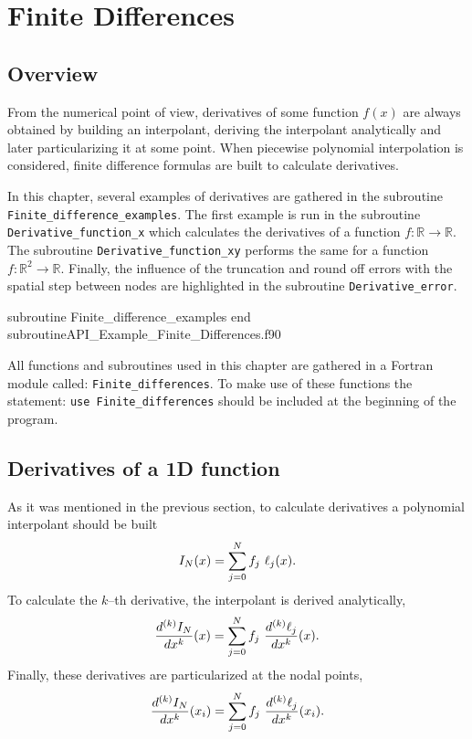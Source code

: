  
    
    \chapter{Finite Differences  }
    \label{Finite_Differences}

    
    
    
    \section{Overview} 
    
   From the numerical point of view, derivatives of some function $ f(x) $ are always obtained by building an interpolant, deriving the interpolant analytically and later particularizing it at some point.  When piecewise polynomial interpolation is considered, finite difference formulas are built to calculate derivatives. 
       
  In this chapter, several examples of derivatives are gathered in the subroutine \verb|Finite_difference_examples|. 
   The first example is run in the subroutine \verb|Derivative_function_x| which calculates the derivatives  of a function $f:\mathbb{R} \rightarrow \mathbb{R}$.
  The subroutine \verb|Derivative_function_xy| performs the same for a function   $f:\mathbb{R}^2\rightarrow \mathbb{R}$. 
  Finally, the influence of the truncation and round off errors with the spatial step between nodes are highlighted in the subroutine \verb|Derivative_error|.     

  \vspace{0.5cm} 
    {subroutine Finite_difference_examples}
    {end subroutine}{API_Example_Finite_Differences.f90}
    
    All functions and subroutines used in this chapter are gathered in a Fortran module 
    called: \verb|Finite_differences|. To make use of these functions the statement: 
    \verb|use Finite_differences|
    should be included at the beginning of the program.
  
    
    
    
    
    \section{Derivatives of a 1D function}
  As it was mentioned in the previous section, to calculate derivatives a polynomial interpolant should be built 
  $$
      I_N(x) = \sum _{j=0} ^{N} f_j \ \lagrange_j(x). 
  $$
  To calculate the $k$--th derivative, the interpolant is derived analytically,
   $$
       \frac{d^{(k)} I_N }{ dx ^k }  (x) = \sum _{j=0} ^{N} f_j \ \frac{d^{(k)} \ell_j }{ dx ^k }(x). 
   $$ 
  Finally, these derivatives are particularized at the nodal points,
   $$
         \frac{d^{(k)} I_N }{ dx ^k }  (x_i) = \sum _{j=0} ^{N} f_j \ \frac{d^{(k)} \ell_j }{ dx ^k }(x_i). 
     $$ 

